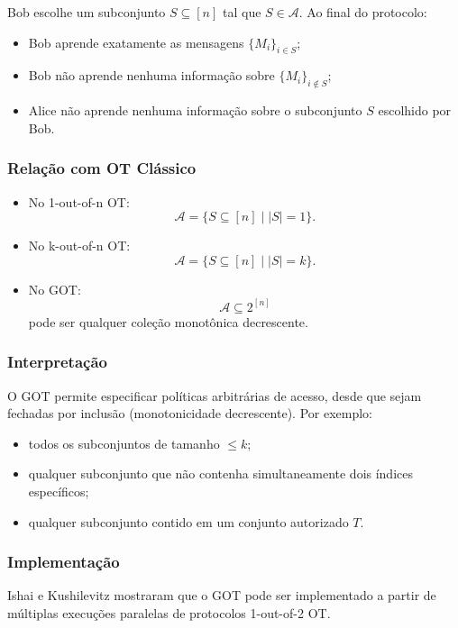 Bob escolhe um subconjunto $S \subseteq [n]$ tal que $S \in \mathcal{A}$. Ao
final do protocolo:

\begin{itemize}
\item Bob aprende exatamente as mensagens $\{M_i\}_{i \in S}$;
\item Bob não aprende nenhuma informação sobre $\{M_i\}_{i \notin S}$;
\item Alice não aprende nenhuma informação sobre o subconjunto $S$ escolhido
por Bob.
\end{itemize}

\subsubsection{Relação com OT Clássico}

\begin{itemize}
\item No 1-out-of-n OT:
\[ \mathcal{A} = \{S \subseteq [n] \mid |S| = 1\}. \]
\item No k-out-of-n OT:
\[ \mathcal{A} = \{S \subseteq [n] \mid |S| = k\}. \]
\item No GOT:
\[ \mathcal{A} \subseteq 2^{[n]} \]
pode ser qualquer coleção monotônica decrescente.
\end{itemize}

\subsubsection{Interpretação}

O GOT permite especificar políticas arbitrárias de acesso, desde que sejam
fechadas por inclusão (monotonicidade decrescente). Por exemplo:

\begin{itemize}
\item todos os subconjuntos de tamanho $\leq k$;
\item qualquer subconjunto que não contenha simultaneamente dois índices
específicos;
\item qualquer subconjunto contido em um conjunto autorizado $T$.
\end{itemize}

\subsubsection{Implementação}

Ishai e Kushilevitz mostraram que o GOT pode ser implementado a partir de
múltiplas execuções paralelas de protocolos 1-out-of-2 OT.

